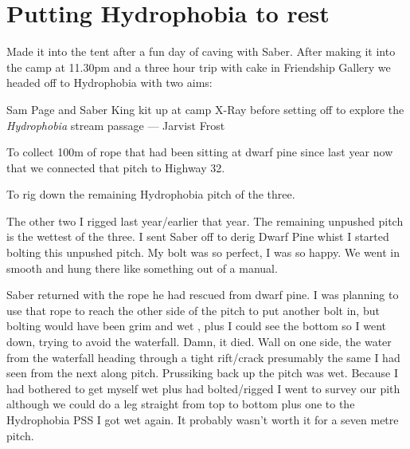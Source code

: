 \begin{marginfigure}
\end{marginfigure}

\section{Putting Hydrophobia to rest}

Made it into the tent after a fun day of caving with Saber. After making it into the camp at 11.30pm and a three hour trip with cake in Friendship Gallery we headed off to Hydrophobia  with two aims: 

\begin{marginfigure}
\centering
{}
\label{sam toothbrush}
\caption{Sam Page and Saber King kit up at camp X-Ray before setting off to explore the \emph{Hydrophobia} stream passage --- Jarvist Frost}
\end{marginfigure}


\begin{citemize} 
 \item To collect 100m of rope that had been sitting at dwarf pine since last year now that we connected that pitch to Highway 32.  
 \item To rig down the remaining Hydrophobia pitch of the three. 
 \end{citemize}
 
 The other two I rigged last year/earlier that year.  The remaining unpushed pitch is the wettest of the three. I sent Saber off to derig Dwarf Pine whist I started bolting this unpushed pitch. My bolt was so perfect, I was so happy. We went in smooth and hung there like something out of a manual. 

Saber returned with the rope he had rescued from dwarf pine.  I was planning to use that rope to reach the other side of the pitch  to put another bolt in, but bolting would have been grim and wet , plus I could see the bottom so I went down, trying to avoid the waterfall. Damn, it died. Wall on one side, the water from the waterfall heading through a tight rift/crack presumably the same I had seen from the next along pitch. Prussiking back up the pitch was wet. Because I had bothered to get myself wet plus had bolted/rigged I went to survey our pith although we could do a leg straight from top to bottom plus one to the Hydrophobia PSS I got wet again. It probably wasn’t worth it for a seven metre pitch.

